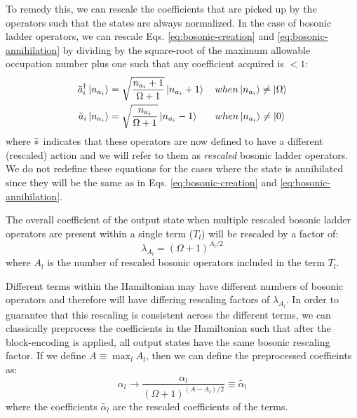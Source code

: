 To remedy this, we can rescale the coefficients that are picked up by the operators such that the states are always normalized.
In the case of bosonic ladder operators, we can rescale Eqs. \ref{eq:bosonic-creation} and \ref{eq:bosonic-annihilation} by dividing by the square-root of the maximum allowable occupation number plus one such that any coefficient acquired is $< 1$:
\begin{equation}
    \label{eq:bosonic-ops-altered}
    \begin{split}
        \Tilde{a}_i^\dagger \ket{n_{a_i}} &= \sqrt{\frac{n_{a_i} + 1}{\Omega + 1}} \ket{n_{a_i} + 1} \hspace{1em} when \ket{n_{a_i}} \neq \ket{\Omega} \\
        \Tilde{a}_i  \ket{n_{a_i}} &= \sqrt{\frac{n_{a_i}}{\Omega + 1}} \ket{n_{a_i} - 1} \hspace{1.7em} when \ket{n_{a_i}} \neq \ket{0}
    \end{split}
\end{equation}
where $\Tilde{*}$ indicates that these operators are now defined to have a different (rescaled) action and we will refer to them as \textit{rescaled} bosonic ladder operators.
We do not redefine these equations for the cases where the state is annihilated since they will be the same as in Eqs.  \ref{eq:bosonic-creation} and \ref{eq:bosonic-annihilation}.

The overall coefficient of the output state when multiple rescaled bosonic ladder operators are present within a single term ($T_l$) will be rescaled by a factor of:
\begin{equation}
    \lambda_{A_l} = (\Omega + 1)^{A_l/2}
\end{equation}
where $A_l$ is the number of rescaled bosonic operators included in the term $T_l$.

Different terms within the Hamiltonian may have different numbers of bosonic operators and therefore will have differing rescaling factors of $\lambda_{A_l}$.
In order to guarantee that this rescaling is consistent across the different terms, we can classically preprocess the coefficients in the Hamiltonian such that after the block-encoding is applied, all output states have the same bosonic rescaling factor.
If we define $A \equiv \max_l{A_l}$, then we can define the preprocessed coeffieints as:
\begin{equation}
    \label{eq:bosonic-coeff-rescaling}
    \alpha_l \rightarrow \frac{\alpha_l}{(\Omega + 1)^{(A - A_l)/2}} \equiv \tilde{\alpha_l}
\end{equation}
where the coefficients $\tilde{\alpha_l}$ are the rescaled coefficients of the terms.

